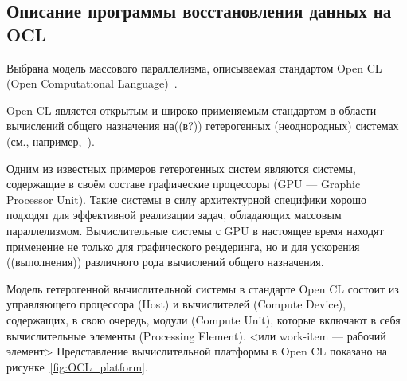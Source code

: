 

\label{sec:OCLprog}


\subsection*{Описание программы восстановления данных на OCL}

Выбрана модель массового параллелизма,
описываемая стандартом Open CL (Open Computational Language)~\cite{doc_OCL}.

Open CL является открытым и широко применяемым стандартом в области вычислений
общего назначения на((в?)) гетерогенных (неоднородных) системах
(см., например,~\cite{paper_OCL_Komdiv}). %

Одним из известных примеров гетерогенных систем являются системы,
содержащие в своём составе графические процессоры (GPU --- Graphic Processor Unit).
Такие системы в силу архитектурной специфики  
хорошо подходят для эффективной реализации задач,
обладающих массовым параллелизмом.
Вычислительные системы с GPU в настоящее время находят применение не только для
графического рендеринга, но и для ускорения ((выполнения)) различного рода
вычислений общего назначения. 


Модель гетерогенной вычислительной системы в стандарте Open CL 
состоит из управляющего процессора (Host)
и вычислителей (Compute Device),
содержащих, в свою очередь, 
модули (Compute Unit),
которые включают в себя вычислительные элементы (Processing Element).
<или work-item --- рабочий элемент>
Представление вычислительной платформы в Open CL
показано на рисунке~\ref{fig:OCL_platform}.

